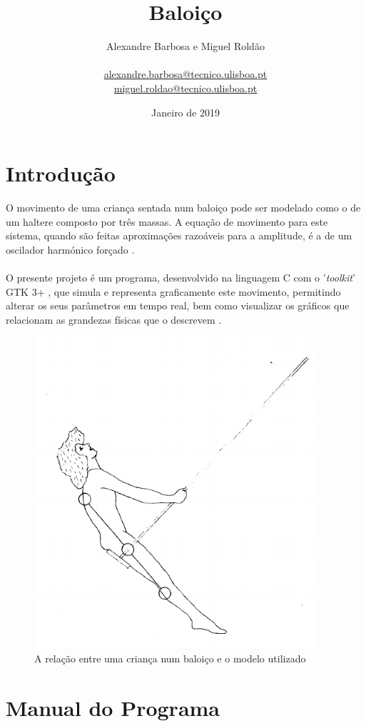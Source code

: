 \documentclass{article}
\title{Baloiço}
\author{Alexandre Barbosa e Miguel Roldão \\
\\\href{mailto:alexandre.barbosa@tecnico.ulisboa.pt}{alexandre.barbosa@tecnico.ulisboa.pt} 
\\
\href{mailto:miguel.roldao@tecnico.ulisboa.pt}{miguel.roldao@tecnico.ulisboa.pt} 
   }
\date{Janeiro de 2019}
\begin{document}
\maketitle

\section{Introdução}
     O movimento de uma criança sentada num baloiço pode ser modelado como o de um haltere composto por três massas. A equação de movimento para este sistema, quando são feitas aproximações razoáveis para a amplitude, é a de um oscilador harmónico forçado \citep{swing}.\\\\
     O presente projeto é um programa, desenvolvido na linguagem C com o '\textit{toolkit}' GTK 3+ \citep{gtk3}, que simula e representa graficamente este movimento, permitindo alterar os seus parâmetros em tempo real, bem como visualizar os gráficos que relacionam as grandezas físicas que o descrevem \citep{tf}.

\begin{figure}[ht]
\centering
\includegraphics[scale=0.45]{swing_seated.png}
\caption{ A relação entre uma criança num baloiço e o modelo utilizado \citep{swing}}
\end{figure}

\section{Manual do Programa}
\end{document}
